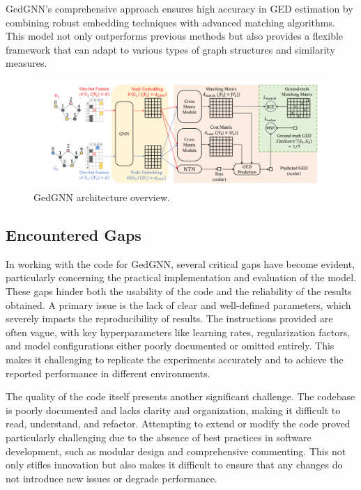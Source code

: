 \documentclass[../Thesis.tex]{subfiles}
\begin{document}
	GedGNN’s comprehensive approach ensures high accuracy in GED estimation by combining robust embedding techniques with advanced matching algorithms. This model not only outperforms previous methods but also provides a flexible framework that can adapt to various types of graph structures and similarity measures.
	
	\begin{figure}[H]
		\centering
		\includegraphics[width=\textwidth]{Images/gedgnn_architecture.png}
		\caption{GedGNN architecture overview.}
		\label{fig:gedgnn_architecture}
	\end{figure}
	
	\subsection{Encountered Gaps}
	
	In working with the code for GedGNN, several critical gaps have become evident, particularly concerning the practical implementation and evaluation of the model. These gaps hinder both the usability of the code and the reliability of the results obtained. A primary issue is the lack of clear and well-defined parameters, which severely impacts the reproducibility of results. The instructions provided are often vague, with key hyperparameters like learning rates, regularization factors, and model configurations either poorly documented or omitted entirely. This makes it challenging to replicate the experiments accurately and to achieve the reported performance in different environments.
	
	The quality of the code itself presents another significant challenge. The codebase is poorly documented and lacks clarity and organization, making it difficult to read, understand, and refactor. Attempting to extend or modify the code proved particularly challenging due to the absence of best practices in software development, such as modular design and comprehensive commenting. This not only stifles innovation but also makes it difficult to ensure that any changes do not introduce new issues or degrade performance.
	
\end{document}

